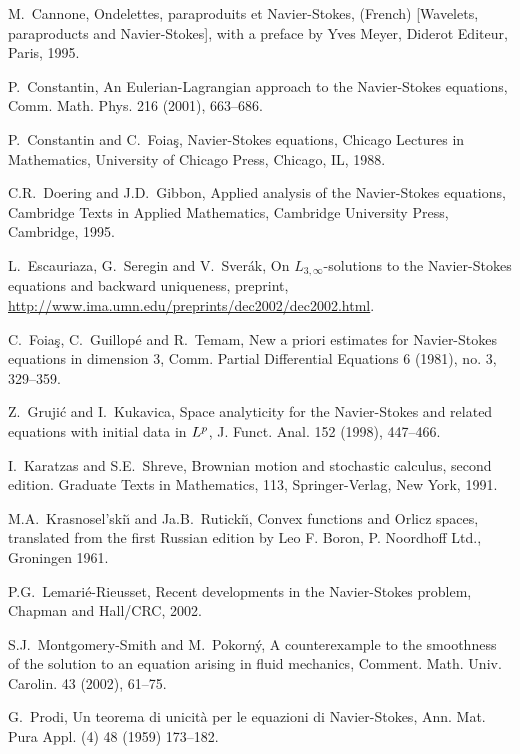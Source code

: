 \documentclass[12pt]{amsart}
\theoremstyle{remark}
\begin{document}
\begin{thebibliography}{999}

M.~Cannone,  Ondelettes, paraproduits et Navier-Stokes, (French) 
[Wavelets, paraproducts and Navier-Stokes], 
with a preface by Yves Meyer, 
Diderot Editeur, Paris, 1995.

P.~Constantin,
An Eulerian-Lagrangian approach to the Navier-Stokes equations, 
Comm. Math. Phys.  216  (2001), 663--686.

P.~Constantin and C.~Foia\c s, 
Navier-Stokes equations, 
Chicago Lectures in Mathematics,
University of Chicago Press, Chicago, IL, 1988.

C.R.~Doering and J.D.~Gibbon,
Applied analysis of the Navier-Stokes equations,
Cambridge Texts in Applied Mathematics,
Cambridge University Press, Cambridge, 1995.

L.~Escauriaza, G.~Seregin and V.~Sver\'ak,
On 
$L_{3,\infty}$-solutions to the Navier-Stokes equations and backward 
uniqueness,
preprint, \url{http://www.ima.umn.edu/preprints/dec2002/dec2002.html}.

C.~Foia\c s, C.~Guillop\'e and R.~Temam,
New a priori estimates for Navier-Stokes equations in dimension $3$,
Comm. Partial Differential Equations 6 (1981), no. 3, 329--359.

Z.~Gruji\'c and I.~Kukavica,
Space analyticity for the Navier-Stokes and related 
equations with initial data in $L\sp p$,
J. Funct. Anal.  152  (1998), 447--466.

I.~Karatzas and S.E.~Shreve,
Brownian motion and stochastic calculus,
second edition. Graduate Texts in Mathematics, 113,
Springer-Verlag, New York, 1991.

M.A.~Krasnosel'ski{\u\i} and Ja.B.~Ruticki\u\i,
Convex functions and Orlicz spaces,
translated from the first Russian edition by Leo F. Boron, 
P. Noordhoff Ltd., 
Groningen 1961.

P.G.~Lemari\'e-Rieusset,
Recent developments in the Navier-Stokes problem,
Chapman and Hall/CRC, 2002.

S.J.~Montgomery-Smith and M.~Pokorn\'y,
A counterexample to the smoothness of the solution to an 
equation arising in fluid mechanics,
Comment. Math. Univ. Carolin.  43  (2002),  61--75.

G.~Prodi,
Un teorema di unicit\`a per le equazioni di Navier-Stokes,
Ann. Mat. Pura Appl. (4)  48  (1959) 173--182.


\end{thebibliography}
\end{document}
